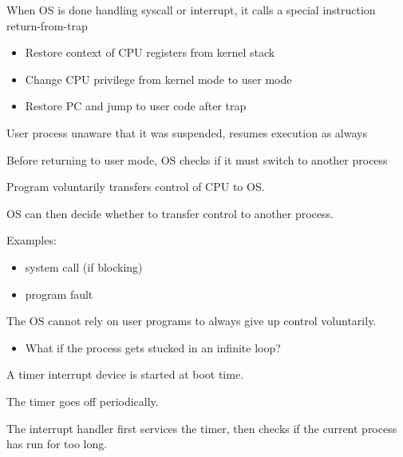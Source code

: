 \begin{slide}

    
    When OS is done handling syscall or interrupt, it calls a special instruction return-from-trap 
    \begin{itemize}
        \item Restore context of CPU registers from kernel stack
        \item Change CPU privilege from kernel mode to user mode
        \item Restore PC and jump to user code after trap
    \end{itemize}
    \bigskip
    
    User process unaware that it was suspended, resumes execution as always
    \bigskip
    
    Before returning to user mode, OS checks if it must switch to another process 
    
\end{slide}

\begin{slide}

    
    Program voluntarily transfers control of CPU to OS.
    \bigskip
    
    OS can then decide whether to transfer control to another process.
    \bigskip
    
    Examples:
    \begin{itemize}
        \item system call (if blocking)
        \item program fault
    \end{itemize}
    \bigskip
    
    The OS cannot rely on user programs to always give up control voluntarily.
    \begin{itemize}
        \item What if the process gets stucked in an infinite loop?
    \end{itemize}
    
\end{slide}

\begin{slide}


    A timer interrupt device is started at boot time.
    \bigskip
	
	The timer goes off periodically.
	\bigskip
	
	The interrupt handler first services the timer, then 
	checks if the current process has run for too long.
	
\end{slide}

